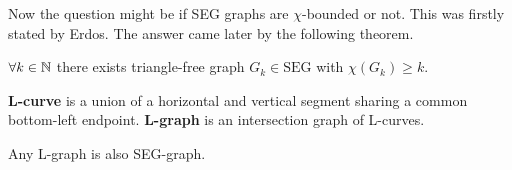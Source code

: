 Now the question might be if SEG graphs are $\chi$-bounded or not. This was firstly stated by Erdos. The answer came later by the following theorem.

\begin{thm}
	$\forall k \in \mathbb{N}$ there exists triangle-free graph $G_k \in \text{SEG}$ with $\chi(G_k) \geq k$.
	\label{PKKLMTW thm}
\end{thm}

\begin{defn}
	\textbf{L-curve} is a union of a horizontal and vertical segment sharing a common bottom-left endpoint. \textbf{L-graph} is an intersection graph of L-curves.
\end{defn}

\begin{thm}
	Any L-graph is also SEG-graph.
\end{thm}

